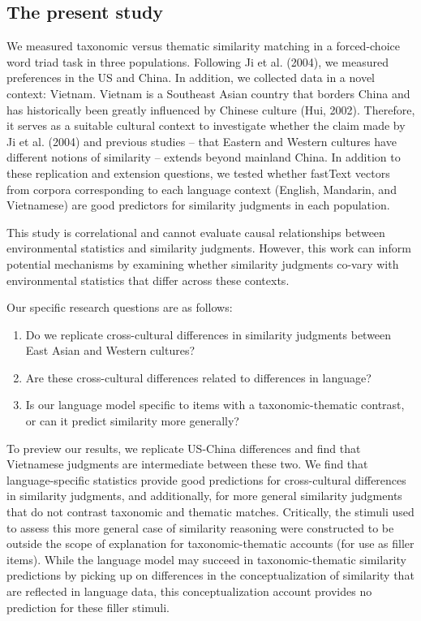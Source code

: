 \documentclass[10pt, letterpaper]{article}
\begin{document}
\hypertarget{the-present-study}{%
\subsection{The present study}\label{the-present-study}}

We measured taxonomic versus thematic similarity matching in a
forced-choice word triad task in three populations. Following Ji et al.
(2004), we measured preferences in the US and China. In addition, we
collected data in a novel context: Vietnam. Vietnam is a Southeast Asian
country that borders China and has historically been greatly influenced
by Chinese culture (Hui, 2002). Therefore, it serves as a suitable
cultural context to investigate whether the claim made by Ji et al.
(2004) and previous studies -- that Eastern and Western cultures have
different notions of similarity -- extends beyond mainland China. In
addition to these replication and extension questions, we tested whether
fastText vectors from corpora corresponding to each language context
(English, Mandarin, and Vietnamese) are good predictors for similarity
judgments in each population.

This study is correlational and cannot evaluate causal relationships
between environmental statistics and similarity judgments. However, this
work can inform potential mechanisms by examining whether similarity
judgments co-vary with environmental statistics that differ across these
contexts.

Our specific research questions are as follows:

\begin{enumerate}
\def\labelenumi{\arabic{enumi}.}
\item
  Do we replicate cross-cultural differences in similarity judgments
  between East Asian and Western cultures?
\item
  Are these cross-cultural differences related to differences in
  language?
\item
  Is our language model specific to items with a taxonomic-thematic
  contrast, or can it predict similarity more generally?
\end{enumerate}

To preview our results, we replicate US-China differences and find that
Vietnamese judgments are intermediate between these two. We find that
language-specific statistics provide good predictions for cross-cultural
differences in similarity judgments, and additionally, for more general
similarity judgments that do not contrast taxonomic and thematic
matches. Critically, the stimuli used to assess this more general case
of similarity reasoning were constructed to be outside the scope of
explanation for taxonomic-thematic accounts (for use as filler items).
While the language model may succeed in taxonomic-thematic similarity
predictions by picking up on differences in the conceptualization of
similarity that are reflected in language data, this conceptualization
account provides no prediction for these filler stimuli.
\end{document}
